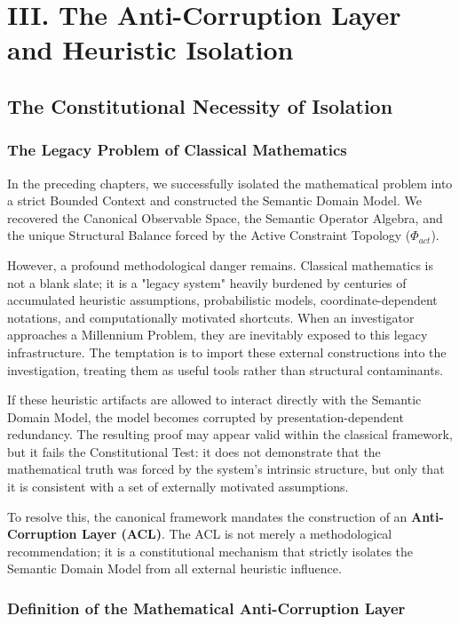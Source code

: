 \documentclass[12pt,openany]{extbook}
\theoremstyle{plain}
\theoremstyle{definition}
\begin{document}
\part{III. The Anti-Corruption Layer and Heuristic Isolation}

\chapter{The Constitutional Necessity of Isolation}

\section{The Legacy Problem of Classical Mathematics}

In the preceding chapters, we successfully isolated the mathematical problem into a strict Bounded Context and constructed the Semantic Domain Model. We recovered the Canonical Observable Space, the Semantic Operator Algebra, and the unique Structural Balance forced by the Active Constraint Topology ($\Phi_{act}$). 

However, a profound methodological danger remains. Classical mathematics is not a blank slate; it is a "legacy system" heavily burdened by centuries of accumulated heuristic assumptions, probabilistic models, coordinate-dependent notations, and computationally motivated shortcuts. When an investigator approaches a Millennium Problem, they are inevitably exposed to this legacy infrastructure. The temptation is to import these external constructions into the investigation, treating them as useful tools rather than structural contaminants.

If these heuristic artifacts are allowed to interact directly with the Semantic Domain Model, the model becomes corrupted by presentation-dependent redundancy. The resulting proof may appear valid within the classical framework, but it fails the Constitutional Test: it does not demonstrate that the mathematical truth was forced by the system's intrinsic structure, but only that it is consistent with a set of externally motivated assumptions. 

To resolve this, the canonical framework mandates the construction of an \textbf{Anti-Corruption Layer (ACL)}. The ACL is not merely a methodological recommendation; it is a constitutional mechanism that strictly isolates the Semantic Domain Model from all external heuristic influence.

\section{Definition of the Mathematical Anti-Corruption Layer}
\end{document}
